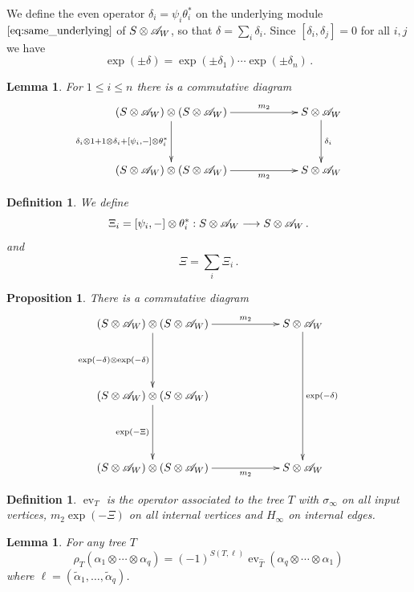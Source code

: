 \documentclass[english,letter paper,12pt,leqno]{article}
\newtheorem{proposition}[theorem]{Proposition}
\newtheorem{lemma}[theorem]{Lemma}
\theoremstyle{example}
\newtheorem{definition}[theorem]{Definition}
\numberwithin{equation}{section}
\def\eval{\operatorname{ev}}
\def\be{\begin{equation}}
\def\ee{\end{equation}}
\begin{document}
We define the even operator $\delta_i = \psi_i \theta_i^*$ on the underlying module $\eqref{eq:same_underlying}$ of $S \otimes \mathscr{A}_W$, so that $\delta = \sum_i \delta_i$. Since $[ \delta_i, \delta_j ] = 0$ for all $i,j$ we have
\be
\exp(\pm \delta) = \exp(\pm \delta_1) \cdots \exp(\pm \delta_n)\,.
\ee

\begin{lemma} For $1 \le i \le n$ there is a commutative diagram
\be
\xymatrix@C+3pc@R+1pc{
(S \otimes \md{A}_W) \otimes (S \otimes \md{A}_W) \ar[d]_-{\delta_i \otimes 1 + 1 \otimes \delta_i + [\psi_i,-] \otimes \theta_i^*} \ar[r]^-{m_2} & S \otimes \md{A}_W \ar[d]^-{\delta_i}\\
(S \otimes \md{A}_W) \otimes (S \otimes \md{A}_W) \ar[r]_-{m_2} & S \otimes \md{A}_W
}
\ee
\end{lemma}

\begin{definition} We define
\be
\Xi_i = [ \psi_i, - ] \otimes \theta_i^* : S \otimes \md{A}_W \lto S \otimes \md{A}_W\,.
\ee
and
\be
\Xi = \sum_i \Xi_i\,.
\ee
\end{definition}

\begin{proposition} There is a commutative diagram
\be
\xymatrix@C+3pc@R+2pc{
(S \otimes \md{A}_W) \otimes (S \otimes \md{A}_W) \ar[d]_-{\exp(-\delta) \otimes \exp(-\delta)} \ar[r]^-{m_2} & S \otimes \md{A}_W \ar[dd]^-{\exp(-\delta)}\\
(S \otimes \md{A}_W) \otimes (S \otimes \md{A}_W) \ar[d]_-{\exp(-\Xi)}\\
(S \otimes \md{A}_W) \otimes (S \otimes \md{A}_W) \ar[r]_-{m_2} & S \otimes \md{A}_W
}
\ee
\end{proposition}

\begin{definition} $\eval_T$ is the operator associated to the tree $T$ with $\sigma_\infty$ on all input vertices, $m_2 \exp(-\Xi)$ on all internal vertices and $H_\infty$ on internal edges.
\end{definition}

\begin{lemma} For any tree $T$
\[
\rho_T( \alpha_1 \otimes \cdots \otimes \alpha_q ) = (-1)^{S(T, \ell)} \eval_{\widehat{T}}( \alpha_q \otimes \cdots \otimes \alpha_1 )
\]
where $\ell = (\widetilde{\alpha}_1,\ldots,\widetilde{\alpha}_q)$.
\end{lemma}
\end{document}
